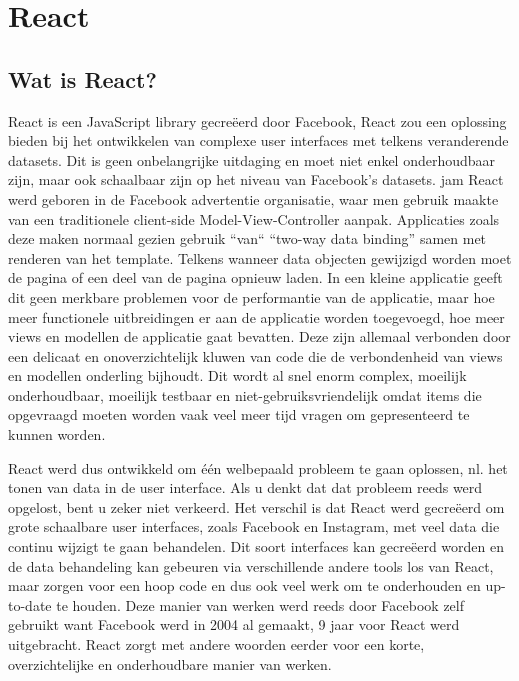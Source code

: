 \chapter{React}\label{ch:react}

\section{Wat is React?}\label{sec:what}
	
	React is een JavaScript library gecreëerd door Facebook, React zou een oplossing bieden bij het ontwikkelen van complexe user interfaces met telkens veranderende datasets. Dit is geen onbelangrijke uitdaging en moet niet enkel onderhoudbaar zijn, maar ook schaalbaar zijn op het niveau van Facebook’s datasets.
	jam
	React werd geboren in de Facebook advertentie organisatie, waar men gebruik maakte van een traditionele client-side Model-View-Controller aanpak. Applicaties zoals deze maken normaal gezien gebruik ``van`` ``two-way data binding'' samen met renderen van het template. Telkens wanneer data objecten gewijzigd worden moet de pagina of een deel van de pagina opnieuw laden. In een kleine applicatie geeft dit geen merkbare problemen voor de performantie van de applicatie, maar hoe meer functionele uitbreidingen er aan de applicatie worden toegevoegd, hoe meer views en modellen de applicatie gaat bevatten. Deze zijn allemaal verbonden door een delicaat en onoverzichtelijk kluwen van code die de verbondenheid van views en modellen onderling bijhoudt. Dit wordt al snel enorm complex, moeilijk onderhoudbaar, moeilijk testbaar en niet-gebruiksvriendelijk omdat items die opgevraagd moeten worden vaak veel meer tijd vragen om gepresenteerd te kunnen worden.
	
	React werd dus ontwikkeld om één welbepaald probleem te gaan oplossen, nl. het tonen van data in de user interface. Als u denkt dat dat probleem reeds werd opgelost, bent u zeker niet verkeerd. Het verschil is dat React werd gecreëerd om grote schaalbare user interfaces, zoals Facebook en Instagram, met veel data die continu wijzigt te gaan behandelen. Dit soort interfaces kan gecreëerd worden en de data behandeling kan gebeuren via verschillende andere tools los van React, maar zorgen voor een hoop code en dus ook veel werk om te onderhouden en up-to-date te houden. Deze manier van werken werd reeds door Facebook zelf gebruikt want Facebook werd in 2004 al gemaakt, 9 jaar voor React werd uitgebracht. React zorgt met andere woorden eerder voor een korte, overzichtelijke en onderhoudbare manier van werken.
	
